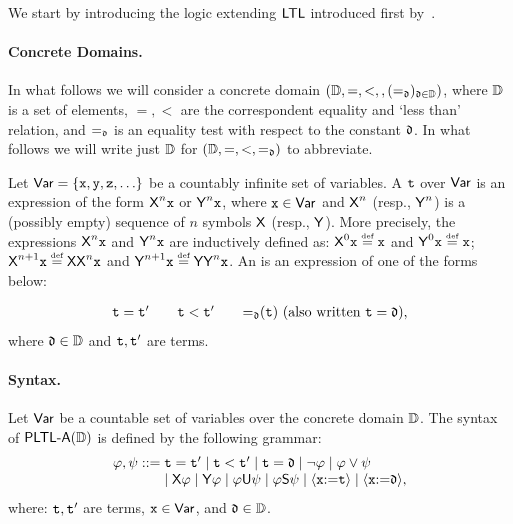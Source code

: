 We start by introducing the logic extending ${\rm\textsf{LTL}}$ introduced first by~\cite{Pnueli77}. 


\paragraph{Concrete Domains.} In what follows we will consider a concrete domain $(\mathbb{D},=,<,,(=_{\mathfrak{d}})_{\mathfrak{d}\in\mathbb{D}})$, where $\mathbb{D}$ is a set of elements, $=,<$ are the correspondent equality and `less than' relation, and $=_{\mathfrak{d}}$ is an equality test with respect to the constant $\mathfrak{d}$.  In what follows we will write just $\mathbb{D}$ for $(\mathbb{D},=,<,=_{\mathfrak{d}})$ to abbreviate.

Let ${\rm \sf Var}=\{\mathtt{x},\mathtt{y},\mathtt{z},\ldots\}$ be a countably infinite set of variables. A  $\mathtt{t}$ over ${\rm \sf Var}$ is an expression of the form ${\operatorname{\sf X}}^n\mathtt{x}$ or ${\operatorname{\sf Y}}^n\mathtt{x}$, where $\mathtt{x}\in{\rm \sf Var}$ and ${\operatorname{\sf X}}^n$ (resp., ${\operatorname{\sf Y}}^n$) is a (possibly empty) sequence of $n$ symbols ${\operatorname{\sf X}}$ (resp., ${\operatorname{\sf Y}}$). 
More precisely, the expressions ${\operatorname{\sf X}}^n\mathtt{x}$ and ${\operatorname{\sf Y}}^n\mathtt{x}$ are inductively defined as: $\Next^0\avar \egdef \avar$ and $\Prev^0\avar \egdef \avar$; $\Next^{n+1}\avar \egdef \Next\Nextn\avar$ and $\Prev^{n+1}\avar \egdef \Prev\Prevn\avar$. 
An  is an expression of one of the forms below:

\[
    \begin{array}{c@{\quad\quad}c@{\quad\quad}c}
        \aterm = \aterm' & \aterm < \aterm' & {=_{\adatum}}(\aterm) \mbox{ (also written $\aterm=\adatum$)},
    \end{array}
\]
where $\mathfrak{d}\in\mathbb{D}$ and $\mathtt{t},\mathtt{t}'$ are terms. 

\paragraph{Syntax.} Let ${\rm \sf Var}$ be a countable set of variables over the concrete domain $\mathbb{D}$. The syntax of ${\rm\textsf{PLTL-A}}(\mathbb{D})$ is defined by the following grammar:
\[
    \begin{array}{l@{\;}l}
    \aformula,\aformulabis  ::= & \aterm = \aterm' \mid \aterm < \aterm' \mid \aterm = \adatum \mid \neg\aformula \mid \aformula \vee \aformulabis \\
     &  \mid \Next\aformula \mid \Prev\aformula \mid \aformula \Until \aformulabis \mid \aformula\Since\aformulabis \mid \Assign{\avar}{\aterm} \mid \Assign{\avar}{\adatum},
    \end{array}
\]
where: $\mathtt{t},\mathtt{t}'$ are terms, $\mathtt{x}\in{\rm \sf Var}$, and $\mathfrak{d}\in\mathbb{D}$.  

